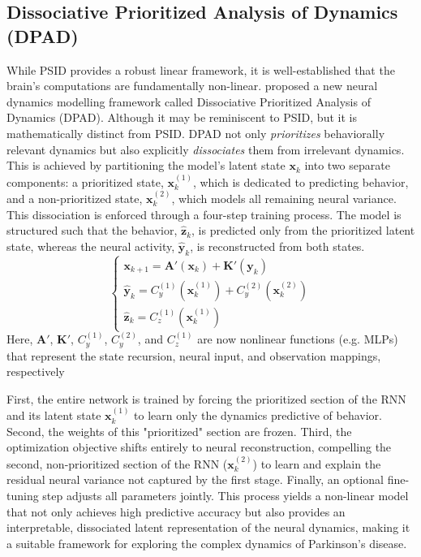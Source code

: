 \documentclass[12pt, a4paper]{article}
\begin{document}
\subsection{Dissociative Prioritized Analysis of Dynamics (DPAD)}

While PSID provides a robust linear framework, it is well-established that the brain's computations are fundamentally non-linear. \textcite{saniDissociativePrioritizedModeling2024} proposed a new neural dynamics modelling framework called Dissociative Prioritized Analysis of Dynamics (DPAD). Although it may be reminiscent to PSID, but it is mathematically distinct from PSID. DPAD not only \textit{prioritizes} behaviorally relevant dynamics but also explicitly \textit{dissociates} them from irrelevant dynamics. This is achieved by partitioning the model's latent state $\mathbf{x}_k$ into two separate components: a prioritized state, $\mathbf{x}_k^{(1)}$, which is dedicated to predicting behavior, and a non-prioritized state, $\mathbf{x}_k^{(2)}$, which models all remaining neural variance.
This dissociation is enforced through a four-step training process. The model is structured such that the behavior, $\hat{\mathbf{z}}_k$, is predicted only from the prioritized latent state, whereas the neural activity, $\hat{\mathbf{y}}_k$, is reconstructed from both states.
$$
    \begin{cases}
        \mathbf{x}_{k+1} = \mathbf{A}'(\mathbf{x}_k) + \mathbf{K}'(\mathbf{y}_k)           \\
        \hat{\mathbf{y}}_k = C_y^{(1)}(\mathbf{x}_k^{(1)}) + C_y^{(2)}(\mathbf{x}_k^{(2)}) \\
        \hat{\mathbf{z}}_k = C_z^{(1)}(\mathbf{x}_k^{(1)})
    \end{cases}
$$
Here, $\mathbf{A}'$, $\mathbf{K}'$, $C_y^{(1)}$, $C_y^{(2)}$, and $C_z^{(1)}$ are now nonlinear functions (e.g. MLPs) that represent the state recursion, neural input, and observation mappings, respectively

First, the entire network is trained by forcing the prioritized section of the RNN and its latent state $\mathbf{x}_k^{(1)}$ to learn only the dynamics predictive of behavior. Second, the weights of this "prioritized" section are frozen. Third, the optimization objective shifts entirely to neural reconstruction, compelling the second, non-prioritized section of the RNN ($\mathbf{x}_k^{(2)}$) to learn and explain the residual neural variance not captured by the first stage. Finally, an optional fine-tuning step adjusts all parameters jointly. This process yields a non-linear model that not only achieves high predictive accuracy but also provides an interpretable, dissociated latent representation of the neural dynamics, making it a suitable framework for exploring the complex dynamics of Parkinson's disease.
\end{document}
